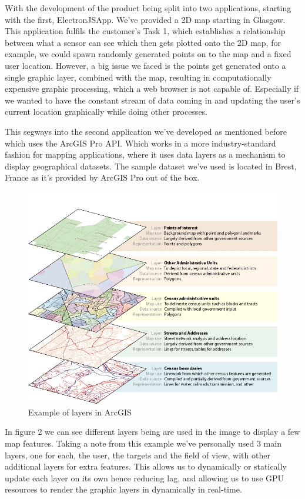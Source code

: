 \documentclass{l3proj}
\begin{document}
With the development of the product being split into two applications, starting with the first, ElectronJSApp. We've provided a 2D map starting in Glasgow. This application fulfils the customer's Task 1, which establishes a relationship between what a sensor can see which then gets plotted onto the 2D map, for example, we could spawn randomly generated points on to the map and a fixed user location. However, a big issue we faced is the points get generated onto a single graphic layer, combined with the map, resulting in computationally expensive graphic processing, which a web browser is not capable of. Especially if we wanted to have the constant stream of data coming in and updating the user's current location graphically while doing other processes. 

This segways into the second application we've developed as mentioned before which uses the ArcGIS Pro API. Which works in a more industry-standard fashion for mapping applications, where it uses data layers as a mechanism to display geographical datasets. The sample dataset we've used is located in Brest, France as it's provided by ArcGIS Pro out of the box.

\begin{figure}[!h]
    \caption{Example of layers in ArcGIS}
    \centering
    \includegraphics[width=\textwidth]{GISLayers.jpg}
\end{figure}

In figure 2 we can see different layers being are used in the image to display a few map features. Taking a note from this example we've personally used 3 main layers, one for each, the user, the targets and the field of view, with other additional layers for extra features. This allows us to dynamically or statically update each layer on its own hence reducing lag, and allowing us to use GPU resources to render the graphic layers in dynamically in real-time. 
\end{document}
